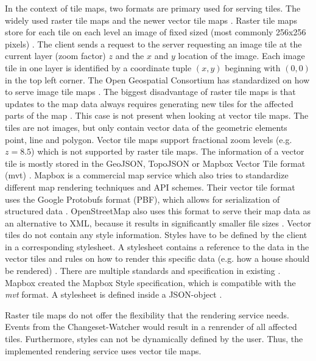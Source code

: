 \documentclass[conference]{IEEEtran}
\begin{document}
In the context of tile maps, two formats are primary used for serving tiles. The widely used raster tile maps and the newer vector tile maps \cite{netek_performance_2020}. Raster tile maps store for each tile on each level an image of fixed sized (most commonly 256x256 pixels) \cite{garcia12}. The client sends a request to the server requesting an image tile at the current layer (zoom factor) $z$ and the $x$ and $y$ location of the image. Each image tile in one layer is identified by a coordinate tuple $(x, y)$ beginning with $(0,0)$ in the top left corner. The Open Geospatial Consortium has standardized on how to serve image tile maps \cite{noauthor_opengis_nodate}. The biggest disadvantage of raster tile maps is that updates to the map data always requires generating new tiles for the affected parts of the map \cite{netek_performance_2020}. This case is not present when looking at vector tile maps. The tiles are not images, but only contain vector data of the geometric elements point, line and polygon. Vector tile maps support fractional zoom levels (e.g. $z=8.5$) which is not supported by raster tile maps. The information of a vector tile is mostly stored in the GeoJSON, TopoJSON or Mapbox Vector Tile format (mvt) \cite{netek_performance_2020}. Mapbox is a commercial map service which also tries to standardize different map rendering techniques and API schemes. Their vector tile format uses the Google Protobufs format (PBF), which allows for serialization of structured data \cite{noauthor_vector_nodate}. OpenStreetMap also uses this format to serve their map data as an alternative to XML, because it results in significantly smaller file sizes \cite{noauthor_pbf_nodate}. Vector tiles do not contain any style information. Styles have to be defined by the client in a corresponding stylesheet. A stylesheet contains a reference to the data in the vector tiles and rules on how to render this specific data (e.g. how a house should be rendered) \cite{netek_performance_2020}. There are multiple standards and specification in existing \cite{noauthor_cartocss_nodate}\cite{noauthor_cartocss_nodate}. Mapbox created the Mapbox Style specification, which is compatible with the \textit{mvt} format. A stylesheet is defined inside a JSON-object \cite{noauthor_style_nodate}.

Raster tile maps do not offer the flexibility that the rendering service needs. Events from the Changeset-Watcher would result in a renrender of all affected tiles. Furthermore, styles can not be dynamically defined by the user. Thus, the implemented rendering service uses vector tile maps. 
\end{document}

